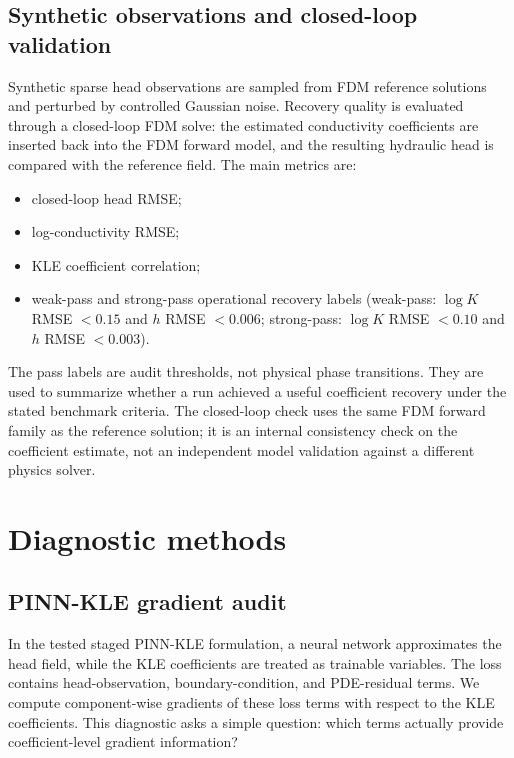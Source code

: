 \documentclass[pdflatex,sn-mathphys,Numbered,iicol]{sn-jnl}
\begin{document}
\subsection{Synthetic observations and closed-loop validation}
\label{sec:obs}

Synthetic sparse head observations are sampled from FDM reference solutions
and perturbed by controlled Gaussian noise. Recovery quality is evaluated
through a closed-loop FDM solve: the estimated conductivity coefficients are
inserted back into the FDM forward model, and the resulting hydraulic head is
compared with the reference field. The main metrics are:
\begin{itemize}
\item closed-loop head RMSE;
\item log-conductivity RMSE;
\item KLE coefficient correlation;
\item weak-pass and strong-pass operational recovery labels (weak-pass:
      $\log K$ RMSE $<0.15$ and $h$ RMSE $<0.006$; strong-pass: $\log K$
      RMSE $<0.10$ and $h$ RMSE $<0.003$).
\end{itemize}
The pass labels are audit thresholds, not physical phase transitions. They are
used to summarize whether a run achieved a useful coefficient recovery under
the stated benchmark criteria. The closed-loop check uses the same FDM forward
family as the reference solution; it is an internal consistency check on the
coefficient estimate, not an independent model validation against a different
physics solver.

\section{Diagnostic methods}
\label{sec:methods}

\subsection{PINN-KLE gradient audit}
\label{sec:grad-audit}

In the tested staged PINN-KLE formulation, a neural network approximates the head
field, while the KLE coefficients are treated as trainable variables. The loss
contains head-observation, boundary-condition, and PDE-residual terms. We
compute component-wise gradients of these loss terms with respect to the KLE
coefficients. This diagnostic asks a simple question: which terms actually
provide coefficient-level gradient information?
\end{document}
